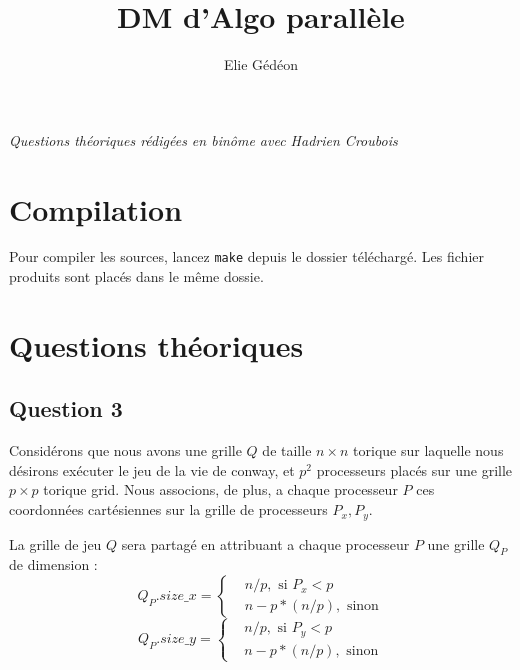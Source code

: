 \documentclass{article}
\begin{document}
\title{DM d'Algo parallèle}
\author{Elie Gédéon}

\maketitle

\begin{center}\textit{Questions théoriques rédigées en binôme avec Hadrien Croubois}\end{center}

\section*{Compilation}
Pour compiler les sources, lancez \texttt{make} depuis le dossier téléchargé. Les fichier produits sont placés dans le même dossie.

\section*{Questions théoriques}
\subsection*{Question 3}

\par Considérons que nous avons une grille $Q$ de taille $n \times n$ torique sur laquelle nous désirons exécuter le jeu de la vie de conway, et $p^2$ processeurs placés sur une grille $p \times p$ torique grid. Nous associons, de plus, a chaque processeur $P$ ces coordonnées cartésiennes sur la grille de processeurs $P_x, P_y$.
 
\par La grille de jeu $Q$ sera partagé en attribuant a chaque processeur $P$ une grille $Q_P$ de dimension :
		$${Q_P}.size\_x =	\begin{cases}
								& n/p, \text{ si } P_x<p \\
								& n-p*(n/p), \text{ sinon}
							\end{cases}$$
		$${Q_P}.size\_y =	\begin{cases}
								& n/p, \text{ si } P_y<p \\
								& n-p*(n/p), \text{ sinon}
							\end{cases}$$
							
\end{document}
